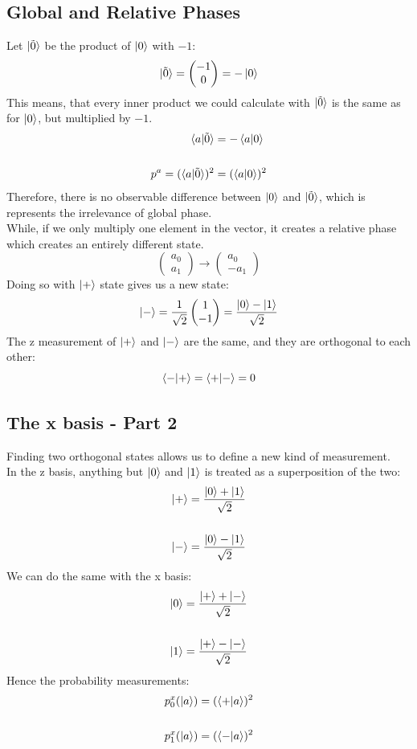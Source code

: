 \documentclass[hidelinks, a4paper, 12pt]{article}
\newcommand{\n}{\\[\baselineskip]}
\begin{document}
        \subsection{Global and Relative Phases}
            Let $\ket{\tilde{0}}$ be the product of $\ket{0}$ with $-1$:
            \[\ket{\tilde{0}} = \begin{pmatrix}
                -1 \\ 0
            \end{pmatrix} = -\ket{0}\]
            This means, that every inner product we could calculate with $\ket{\tilde{0}}$ is the same as for $\ket{0}$, but multiplied by $-1$.
            \[\begin{split}
                \braket{a|\tilde{0}} &= -\braket{a|0}\n
                p^a = (\braket{a|\tilde{0}})^2 &= (\braket{a|0})^2
            \end{split}\]
            Therefore, there is no observable difference between $\ket{0}$ and $\ket{\tilde{0}}$, which is represents the irrelevance of global phase.\n
            While, if we only multiply one element in the vector, it creates a relative phase which creates an entirely different state.
            \[\begin{pmatrix} a_0 \\ a_1 \end{pmatrix} \rightarrow \begin{pmatrix} a_0 \\ -a_1 \end{pmatrix}\]
            Doing so with $\ket{+}$ state gives us a new state:
            \[\ket{-} = \frac{1}{\sqrt{2}} \begin{pmatrix} 1 \\ -1 \end{pmatrix} = \frac{\ket{0} - \ket{1}}{\sqrt{2}}\]
            The z measurement of $\ket{+}$ and $\ket{-}$ are the same, and they are orthogonal to each other:
            \[\braket{-|+} = \braket{+|-} = 0\]

        \subsection{The x basis - Part 2}
            Finding two orthogonal states allows us to define a new kind of measurement.\n
            In the z basis, anything but $\ket{0}$ and $\ket{1}$ is treated as a superposition of the two:
            \[\begin{split}
                \ket{+} &= \frac{\ket{0} + \ket{1}}{\sqrt{2}}\n
                \ket{-} &= \frac{\ket{0} - \ket{1}}{\sqrt{2}}
            \end{split}\]
            We can do the same with the x basis:
            \[\begin{split}
                \ket{0} &= \frac{\ket{+} + \ket{-}}{\sqrt{2}}\n
                \ket{1} &= \frac{\ket{+} - \ket{-}}{\sqrt{2}}
            \end{split}\]
            Hence the probability measurements:
            \[\begin{split}
                p_0^x (\ket{a}) &= (\braket{+|a})^2\n
                p_1^x (\ket{a}) &= (\braket{-|a})^2\n
            \end{split}\]
\end{document}

